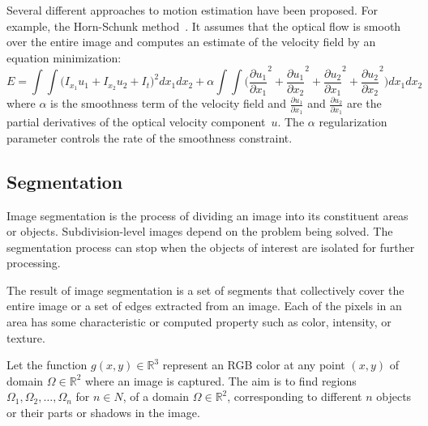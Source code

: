 \documentclass[graybox]{svmult}
\begin{document}
Several different approaches to motion estimation have been proposed. For example,
the Horn-Schunk method~\cite{horn}. It assumes that the optical flow is smooth over the entire image and computes an estimate of the velocity field by an equation minimization:
\[
E = \int \!\!\! \int \bigl(I_{x_1}u_1 + I_{x_2}u_2 + I_t\bigr)^2 dx_1dx_2 + \alpha \int \!\!\! \int \biggl(\frac{\partial u_1}{\partial x_1}^2 + \frac{\partial u_1}{\partial x_2}^2 + \frac{\partial u_2}{\partial x_1}^2 + \frac{\partial u_2}{\partial x_2}^2\biggr)dx_1dx_2
\]
where $\alpha$ is the smoothness term of the velocity field and
$\frac{\partial u_1}{\partial x_1}$ and 
$\frac{\partial u_2}{\partial x_1}$
are the partial derivatives of the optical velocity component~$u$. The $\alpha$ regularization parameter controls the rate of the smoothness constraint. 

\subsection{Segmentation}
Image segmentation is the process of dividing an image into
its constituent areas or objects. Subdivision-level
images depend on the problem being solved. The segmentation process can stop when the objects of interest are isolated for further processing.

The result of image segmentation is a set of segments that collectively cover the entire image or a set of edges extracted from an image. Each of the pixels in an area has some characteristic or computed property such as color, intensity, or texture.

Let the function $g(x,y) \in \mathbb{R}^3$ represent an RGB color at any point $(x,y)$  of domain $\Omega \in  \mathbb{R}^2$ where an image is captured.
The aim is to find regions 
${\Omega}_1, {\Omega}_2, \ldots, {\Omega}_n $ for  $n \in N$, of a domain $\Omega \in \mathbb{R}^2$, corresponding to different $n$ objects or their parts or shadows in the image. 
\end{document}
